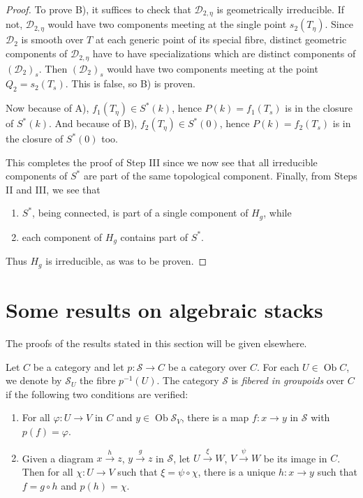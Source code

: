 \documentclass[10pt]{amsart}
\theoremstyle{plain}
\theoremstyle{definition}
\DeclareMathOperator{\Ob}{Ob}
\begin{document}
\begin{proof}
To prove B), it suffices to check that $\mathscr{D}_{2,\eta}$ is geometrically irreducible. If not, $\mathscr{D}_{2,\eta}$ would have two components meeting at the single point $s_2(T_\eta)$. Since $\mathscr{D}_2$ is smooth over $T$ at each generic point of its special fibre, distinct geometric components of $\mathscr{D}_{2,\eta}$ have to have specializations which are distinct components of $(\mathscr{D}_2)_s$. Then $(\mathscr{D}_2)_s$ would have two components meeting at the point $Q_2 = s_2(T_s)$. This is false, so B) is proven.

Now because of A), $f_1(T_\eta) \in S^*(k)$, hence $P(k) = f_1(T_s)$ is in the closure of $S^*(k)$. And because of B), $f_2(T_\eta) \in S^*(0)$, hence $P(k) = f_2(T_s)$ is in the closure of $S^*(0)$ too.

This completes the proof of Step III since we now see that all irreducible components of $S^*$ are part of the same topological component. Finally, from Steps II and III, we see that
\begin{enumerate}
\item[a)] $S^*$, being connected, is part of a single component of $H_g$, while
\item[b)] each component of $H_g$ contains part of $S^*$.
\end{enumerate}
Thus $H_g$ is irreducible, as was to be proven.
\end{proof}

\section{Some results on algebraic stacks}\label{sec:4}

The proofs of the results stated in this section will be given elsewhere.

Let $C$ be a category and let $p: \mathscr{S} \to C$ be a category over $C$. For each $U \in \Ob C$, we denote by $\mathscr{S}_U$ the fibre $p^{-1}(U)$. The category $\mathscr{S}$ is \emph{fibered in groupoids} over $C$ if the following two conditions are verified:

\begin{enumerate}
\item[a)] For all $\varphi: U \to V$ in $C$ and $y \in \Ob \mathscr{S}_V$, there is a map $f: x \to y$ in $\mathscr{S}$ with $p(f) = \varphi$.
\item[b)] Given a diagram $x \xrightarrow{h} z$, $y \xrightarrow{g} z$ in $\mathscr{S}$, let $U \xrightarrow{\xi} W$, $V \xrightarrow{\psi} W$ be its image in $C$. Then for all $\chi: U \to V$ such that $\xi = \psi \circ \chi$, there is a unique $h: x \to y$ such that $f = g \circ h$ and $p(h) = \chi$.
\end{enumerate}
\end{document}
